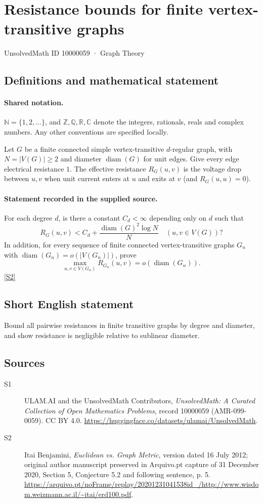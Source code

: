 \documentclass[11pt]{article}
\newcommand{\sref}[2]{\hyperlink{source:#1:#2}{[S#2]}}
\begin{document}
\setcounter{section}{10000058}
\section{Resistance bounds for finite vertex-transitive graphs}\label{10000059}
{\small\sffamily UnsolvedMath ID 10000059 · Graph Theory}
\subsection{Definitions and mathematical statement}

\paragraph{Shared notation.}$\mathbb N=\{1,2,\ldots\}$, and $\mathbb Z,\mathbb Q,\mathbb R,\mathbb C$ denote the integers, rationals, reals and complex numbers. Any other conventions are specified locally.


Let $G$ be a finite connected simple vertex-transitive $d$-regular graph, with $N=|V(G)|\ge2$ and diameter $\operatorname{diam}(G)$ for unit edges. Give every edge electrical resistance $1$. The effective resistance $R_G(u,v)$ is the voltage drop between $u,v$ when unit current enters at $u$ and exits at $v$ (and $R_G(u,u)=0$).
\paragraph{Statement recorded in the supplied source.}
For each degree $d$, is there a constant $C_d<\infty$ depending only on $d$ such that
\[R_G(u,v)<C_d+\frac{\operatorname{diam}(G)^2\log N}{N}\quad(u,v\in V(G))?\]
In addition, for every sequence of finite connected vertex-transitive graphs $G_n$ with $\operatorname{diam}(G_n)=o(|V(G_n)|)$, prove
\[\max_{u,v\in V(G_n)}R_{G_n}(u,v)=o(\operatorname{diam}(G_n)).\] \sref{10000059}{2}
\subsection{Short English statement}
Bound all pairwise resistances in finite transitive graphs by degree and diameter, and show resistance is negligible relative to sublinear diameter.
\subsection{Sources}
\begin{description}
\item[\hypertarget{source:10000059:1}{S1}] ULAM.AI and the UnsolvedMath Contributors, \emph{UnsolvedMath: A Curated Collection of Open Mathematics Problems}, record 10000059 (AMR-099-0059). CC BY 4.0. \url{https://huggingface.co/datasets/ulamai/UnsolvedMath}.
\item[\hypertarget{source:10000059:2}{S2}] Itai Benjamini, \emph{Euclidean vs. Graph Metric}, version dated 16 July 2012; original author manuscript preserved in Arquivo.pt capture of 31 December 2020, Section 5, Conjecture 5.2 and following sentence, p. 5. \url{https://arquivo.pt/noFrame/replay/20201231041538id_/http://www.wisdom.weizmann.ac.il/~itai/erd100.pdf}.
\end{description}
\label{end:10000059}
\end{document}
